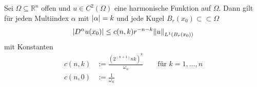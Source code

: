 \begin{satz}
	Sei $\Omega \subseteq \mathbb{R}^n$ offen und $u \in C^2(\Omega)$ eine harmonische Funktion auf $\Omega$. Dann gilt für jeden Multiindex $\alpha$ mit $ \lvert\alpha\rvert=k$ und jede Kugel $B_r(x_0) \subset \subset \Omega$
	\begin{equation}
		\abs{D^{\alpha}u(x_0)} \leq c(n,k)r^{-n-k} \norm{u}_{L^1(B_r(x_0))}
	\end{equation}
	mit Konstanten 
	\begin{align}
		c(n,k) &:= \frac{\left( 2^{(n+1)}nk \right)^k}{\omega_n} \qquad \text{für }k=1,\dots,n \\
		c(n,0) &:= \frac{1}{\omega_n}
	\end{align}
\end{satz}

